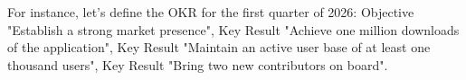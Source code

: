 \noindent For instance, let's define the OKR for the first quarter of 2026: Objective "Establish a strong market 
presence", Key Result "Achieve one million downloads of the application", Key Result "Maintain an active user base of at 
least one thousand users", Key Result "Bring two new contributors on board".
